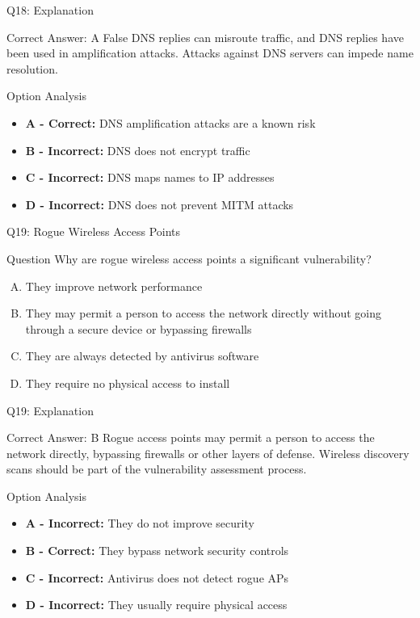 \documentclass{beamer}
\begin{document}
	\begin{frame}{Q18: Explanation}
		\begin{block}{Correct Answer: A}
			False DNS replies can misroute traffic, and DNS replies have been used in amplification attacks. Attacks against DNS servers can impede name resolution.
		\end{block}
		\begin{block}{Option Analysis}
			\begin{itemize}
				\item \textbf{A - Correct:} DNS amplification attacks are a known risk
				\item \textbf{B - Incorrect:} DNS does not encrypt traffic
				\item \textbf{C - Incorrect:} DNS maps names to IP addresses
				\item \textbf{D - Incorrect:} DNS does not prevent MITM attacks
			\end{itemize}
		\end{block}
	\end{frame}
	
	\begin{frame}{Q19: Rogue Wireless Access Points}
		\begin{block}{Question}
			Why are rogue wireless access points a significant vulnerability?
		\end{block}
		\begin{enumerate}[(A)]
			\item They improve network performance
			\item They may permit a person to access the network directly without going through a secure device or bypassing firewalls
			\item They are always detected by antivirus software
			\item They require no physical access to install
		\end{enumerate}
	\end{frame}
	
	\begin{frame}{Q19: Explanation}
		\begin{block}{Correct Answer: B}
			Rogue access points may permit a person to access the network directly, bypassing firewalls or other layers of defense. Wireless discovery scans should be part of the vulnerability assessment process.
		\end{block}
		\begin{block}{Option Analysis}
			\begin{itemize}
				\item \textbf{A - Incorrect:} They do not improve security
				\item \textbf{B - Correct:} They bypass network security controls
				\item \textbf{C - Incorrect:} Antivirus does not detect rogue APs
				\item \textbf{D - Incorrect:} They usually require physical access
			\end{itemize}
		\end{block}
	\end{frame}
	
\end{document}
